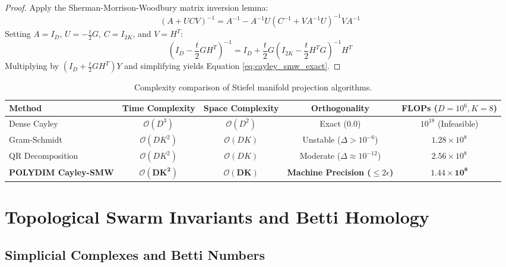 \documentclass[11pt,twoside,a4paper]{article}
\theoremstyle{plain}
\theoremstyle{definition}
\theoremstyle{remark}
\begin{document}
\begin{proof}
Apply the Sherman-Morrison-Woodbury matrix inversion lemma:
\begin{equation}
(A + U C V)^{-1} = A^{-1} - A^{-1} U (C^{-1} + V A^{-1} U)^{-1} V A^{-1}
\end{equation}
Setting $A = I_D$, $U = -\frac{t}{2} G$, $C = I_{2K}$, and $V = H^T$:
\begin{equation}
\left( I_D - \frac{t}{2} G H^T \right)^{-1} = I_D + \frac{t}{2} G \left( I_{2K} - \frac{t}{2} H^T G \right)^{-1} H^T
\end{equation}
Multiplying by $(I_D + \frac{t}{2} G H^T) Y$ and simplifying yields Equation \eqref{eq:cayley_smw_exact}.
\end{proof}

\begin{table}[h]
\centering
\begin{tabular}{@{}lcccc@{}}
\toprule
\textbf{Method} & \textbf{Time Complexity} & \textbf{Space Complexity} & \textbf{Orthogonality} & \textbf{FLOPs ($D=10^6, K=8$)} \\
\midrule
Dense Cayley & $\mathcal{O}(D^3)$ & $\mathcal{O}(D^2)$ & Exact ($0.0$) & $10^{18}$ (Infeasible) \\
Gram-Schmidt & $\mathcal{O}(D K^2)$ & $\mathcal{O}(DK)$ & Unstable ($\Delta > 10^{-6}$) & $1.28 \times 10^8$ \\
QR Decomposition & $\mathcal{O}(D K^2)$ & $\mathcal{O}(DK)$ & Moderate ($\Delta \approx 10^{-12}$) & $2.56 \times 10^8$ \\
\textbf{POLYDIM Cayley-SMW} & $\mathbf{\mathcal{O}(D K^2)}$ & $\mathbf{\mathcal{O}(DK)}$ & \textbf{Machine Precision ($\le 2\epsilon$)} & $\mathbf{1.44 \times 10^8}$ \\
\bottomrule
\end{tabular}
\caption{Complexity comparison of Stiefel manifold projection algorithms.}

\end{table}

\section{Topological Swarm Invariants and Betti Homology}
\label{sec:topological_invariants}

\subsection{Simplicial Complexes and Betti Numbers}
\end{document}
